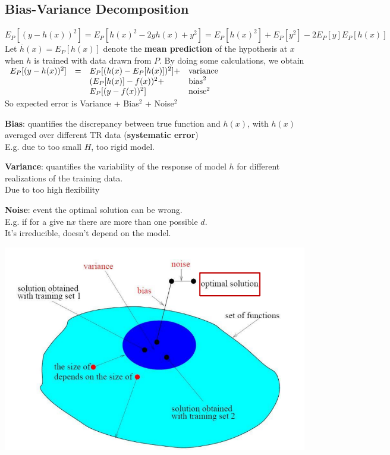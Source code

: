 \documentclass[10pt]{report}
\begin{document}
\subsection{Bias-Variance Decomposition}
$$E_P[(y - h(x))^2] = E_P[h(x)^2 - 2yh(x) + y^2] = E_P[h(x)^2] + E_P[y^2] - 2E_P[y]E_P[h(x)]$$
Let $\overline{h}(x) = E_P[h(x)]$ denote the \textbf{mean prediction} of the hypothesis at $x$ when $h$ is trained with data drawn from $P$. By doing some calculations, we obtain $\begin{array}{r c l l}
E_P[(y-h(x))^2] & = & E_P[(h(x) - E_P[h(x)])^2] + & \text{variance}\\
 & & (E_P[h(x)] - f(x))^2 + & \text{bias}^2 \\
 & & E_P[(y - f(x))^2] & \text{noise}^2
\end{array}$\\
So expected error is Variance + Bias$^2$ + Noise$^2$\begin{list}{}{}
	\item \textbf{Bias}: quantifies the discrepancy between true function and $h(x)$, with $h(x)$ averaged over different TR data (\textbf{systematic error})\\E.g. due to too small $H$, too rigid model.
	\item \textbf{Variance}: quantifies the variability of the response of model $h$ for different realizations of the training data.\\Due to too high flexibility
	\item \textbf{Noise}: event the optimal solution can be wrong.\\E.g. if for a give n$x$ there are more than one possible $d$.\\
	It's irreducible, doesn't depend on the model.
\end{list}
\begin{center}
	\includegraphics[scale=0.5]{24.png}
\end{center}
\end{document}
